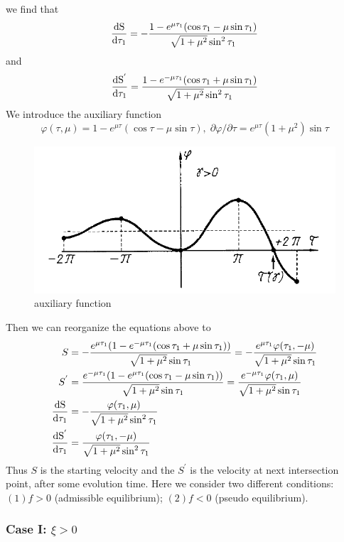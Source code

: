 \documentclass{article}
\begin{document}
 we find that \[ \frac{\rm d S}{\rm d \tau_1}=-\frac{1-e^{\mu \tau_1}(\cos{\tau_1}-\mu\sin{\tau_1})}{\sqrt{1+\mu^2}\sin^2{\tau_1}}
\] and  \[ \frac{\rm d S^{'}}{\rm d \tau_1}= \frac{1-e^{-\mu \tau_1}(\cos{\tau_1}+\mu \sin{\tau_1})}{\sqrt{1+\mu^2}\sin^2{\tau_1}}\]
 We introduce the auxiliary function\cite{ANDRONOV1966443}
 \begin{equation}
     \varphi(\tau,\mu)=1-e^{\mu \tau}(\cos{\tau}-\mu\sin{\tau}), \; \partial \varphi/\partial{\tau}=e^{\mu\tau}(1+\mu^2)\sin{\tau}
 \end{equation}
 \begin{figure}
    \centering
    \includegraphics[width=0.6 \textwidth]{pictures/auxiliary_fun.png}
    \caption{auxiliary function}
    \label{fig:auxiliary function}
\end{figure}
Then we can reorganize the equations above to
\begin{subequations} \label{eq: reorganization after aux}
\begin{align}
    S&=-\frac{e^{\mu \tau_1}(1-e^{-\mu \tau_1}(\cos{\tau_1}+\mu \sin{\tau_1}))}{\sqrt{1+\mu^2}\sin{\tau_1}} = -\frac{e^{\mu \tau_1}\varphi(\tau_1,-\mu)}{\sqrt{1+\mu^2}\sin{\tau_1}}  \label{eq: REO S}\\ 
    S^{'}&=\frac{e^{-\mu \tau_1}(1-e^{\mu \tau_1}(\cos{\tau_1}-\mu \sin{\tau_1}))}{\sqrt{1+\mu^2}\sin{\tau_1}}=\frac{e^{-\mu \tau_1}\varphi(\tau_1,\mu)}{\sqrt{1+\mu^2}\sin{\tau_1}}    \label{eq: REO S'} \\
    \frac{\rm d S}{\rm d \tau_1}&=-\frac{\varphi(\tau_1,\mu)}{\sqrt{1+\mu^2}\sin^2{\tau_1}}  \label{eq：REO dSdt} \\
    \frac{\rm d S^{'}}{\rm d \tau_1}&=\frac{\varphi(\tau_1,-\mu)}{\sqrt{1+\mu^2}\sin^2{\tau_1}} \label{eq: REO dS'dt}
\end{align}
\end{subequations}
Thus $S$ is the starting velocity and the $S^{'}$ is the velocity at next intersection point, after some evolution time. Here we consider two different conditions: $(1)f>0$ (admissible equilibrium); $(2)f<0$ (pseudo equilibrium).

\subsubsection{Case I: $\xi>0$}
\end{document}
